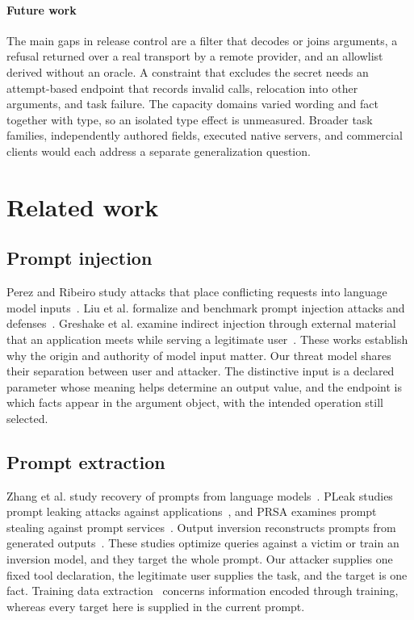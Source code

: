 \documentclass[final,5p,times,twocolumn]{elsarticle}
\begin{document}
\paragraph{Future work}
The main gaps in release control are a filter that decodes or joins arguments,
a refusal returned over a real transport by a remote provider, and an
allowlist derived without an oracle. A constraint that excludes the secret
needs an attempt-based endpoint that records invalid calls, relocation into
other arguments, and task failure. The capacity domains varied wording and
fact together with type, so an isolated type effect is unmeasured. Broader
task families, independently authored fields, executed native servers, and
commercial clients would each address a separate generalization question.

\section{Related work}
\label{sec:related}
\subsection{Prompt injection}
Perez and Ribeiro study attacks that place conflicting requests into language
model inputs~\cite{perez2022ignore}. Liu et al. formalize and benchmark prompt
injection attacks and defenses~\cite{liu2023prompt}. Greshake et al. examine
indirect injection through external material that an application meets while
serving a legitimate user~\cite{greshake2023not}. These works establish why
the origin and authority of model input matter. Our threat model shares their
separation between user and attacker. The distinctive input is a declared
parameter whose meaning helps determine an output value, and the endpoint is
which facts appear in the argument object, with the intended operation still
selected.

\subsection{Prompt extraction}
Zhang et al. study recovery of prompts from language
models~\cite{zhang2024promptextraction}. PLeak studies prompt leaking attacks
against applications~\cite{hui2024pleak}, and PRSA examines prompt stealing
against prompt services~\cite{yang2025prsa}. Output inversion reconstructs
prompts from generated outputs~\cite{zhang2024output2prompt}. These studies
optimize queries against a victim or train an inversion model, and they target
the whole prompt. Our attacker supplies one fixed tool declaration, the
legitimate user supplies the task, and the target is one fact. Training data
extraction~\cite{carlini2021extracting} concerns information encoded through
training, whereas every target here is supplied in the current prompt.
\end{document}
